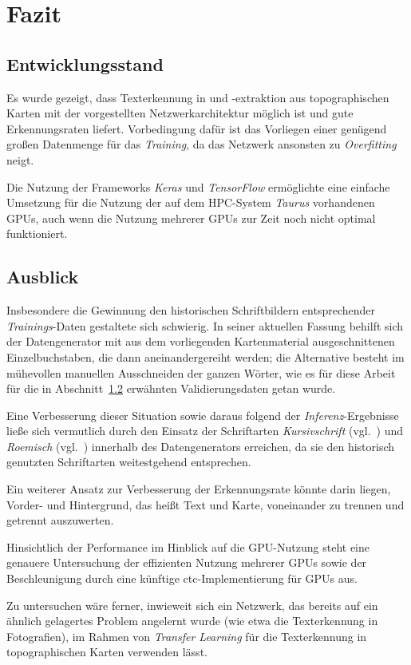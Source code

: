 \section{Fazit}

\subsection{Entwicklungsstand}

Es wurde gezeigt, dass Texterkennung in und -extraktion aus topographischen Karten mit der vorgestellten
Netzwerkarchitektur möglich ist und gute Erkennungsraten liefert. Vorbedingung dafür ist das Vorliegen einer genügend
großen Datenmenge für das \textit{Training}, da das Netzwerk ansonsten zu \textit{Overfitting} neigt.

Die Nutzung der Frameworks \textit{Keras} und \textit{TensorFlow} ermöglichte eine einfache Umsetzung für die Nutzung
der auf dem HPC-System \textit{Taurus} vorhandenen GPUs, auch wenn die Nutzung mehrerer GPUs zur Zeit noch nicht
optimal funktioniert.

\subsection{Ausblick}

Insbesondere die Gewinnung den historischen Schriftbildern entsprechender \textit{Trainings}-Daten gestaltete sich
schwierig. In seiner aktuellen Fassung behilft sich der Datengenerator mit aus dem vorliegenden Kartenmaterial
ausgeschnittenen Einzelbuchstaben, die dann aneinandergereiht werden; die Alternative besteht im mühevollen manuellen
Ausschneiden der ganzen Wörter, wie es für diese Arbeit für die in Abschnitt~\ref{} erwähnten Validierungsdaten getan
wurde.

Eine Verbesserung dieser Situation sowie daraus folgend der \textit{Inferenz}-Ergebnisse ließe sich vermutlich durch
den Einsatz der Schriftarten \textit{Kursivschrift} (vgl.~\cite{kursivschrift}) und \textit{Roemisch}
(vgl.~\cite{roemisch}) innerhalb des Datengenerators erreichen, da sie den historisch genutzten Schriftarten
weitestgehend entsprechen.

Ein weiterer Ansatz zur Verbesserung der Erkennungsrate könnte darin liegen, Vorder- und Hintergrund, das heißt Text
und Karte, voneinander zu trennen und getrennt auszuwerten.

Hinsichtlich der Performance im Hinblick auf die GPU-Nutzung steht eine genauere Untersuchung der effizienten Nutzung
mehrerer GPUs sowie der Beschleunigung durch eine künftige \gls{ctc}-Implementierung für GPUs aus.

Zu untersuchen wäre ferner, inwieweit sich ein Netzwerk, das bereits auf ein ähnlich gelagertes Problem angelernt
wurde (wie etwa die Texterkennung in Fotografien), im Rahmen von \textit{Transfer Learning} für die Texterkennung in
topographischen Karten verwenden lässt.
